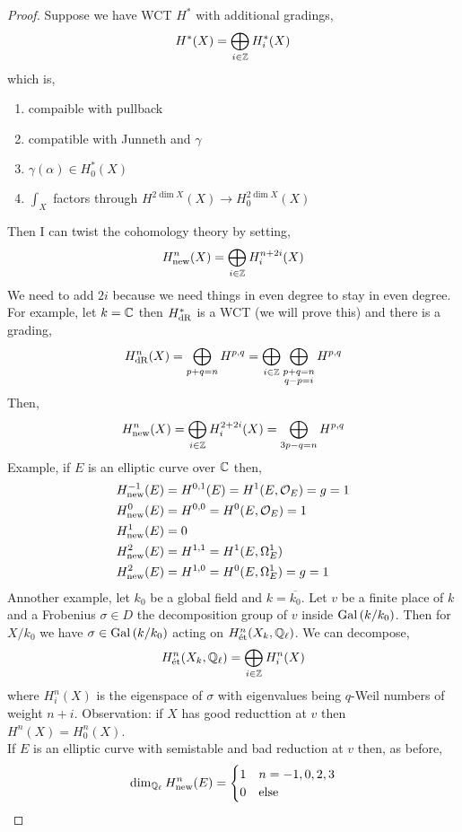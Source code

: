 \documentclass[12pt]{article}
\begin{document}
\begin{proof}
Suppose we have WCT $H^*$ with additional gradings,
\[ H^*(X) = \bigoplus_{i \in \mathbb{Z}} H^*_i(X) \]
which is,
\begin{enumerate}
\item compaible with pullback
\item compatible with Junneth and $\gamma$
\item $\gamma(\alpha) \in H^*_0(X)$
\item $\int_X$ factors through $H^{2 \dim{X}}(X) \to H_0^{2 \dim{X}}(X)$
\end{enumerate}
Then I can twist the cohomology theory by setting,
\[ H^n_{\text{new}}(X) = \bigoplus_{i \in \mathbb{Z}} H^{n + 2 i}_i(X) \]
We need to add $2i$ because we need things in even degree to stay in even degree. 
\bigskip\\
For example, let $k = \mathbb{C}$ then $H^*_{\mathrm{dR}}$ is a WCT (we will prove this) and there is a grading,
\[ H^n_{\mathrm{dR}}(X) = \bigoplus_{p + q = n} H^{p,q} = \bigoplus_{i \in \mathbb{Z}} \bigoplus_{\substack{p + q = n \\ q - p = i}} H^{p,q} \]
Then,
\[ H_{\text{new}}^n(X) = \bigoplus_{i \in \mathbb{Z}} H^{2 + 2i}_i(X) = \bigoplus_{3 p - q = n} H^{p,q} \]
Example, if $E$ is an elliptic curve over $\mathbb{C}$ then,
\begin{align*}
H^{-1}_{\text{new}}(E) & = H^{0,1}(E) = H^1(E, \mathcal{O}_{E}) = g = 1 
\\
H^0_{\text{new}}(E) & = H^{0,0} = H^0(E, \mathcal{O}_{E}) = 1 
\\
H^1_{\text{new}}(E) & = 0
\\
H^2_{\text{new}}(E) & = H^{1,1} = H^1(E, \Omega^1_E) 
\\
H^2_{\text{new}}(E) & = H^{1,0} =H^0(E, \Omega^1_E) = g = 1
\end{align*}
Annother example, let $k_0$ be a global field and $k = \overline{k_0}$. Let $v$ be a finite place of $k$ and a Frobenius $\sigma \in D$ the decomposition group of $v$ inside $\mathrm{Gal}\left( k / k_0 \right)$. Then for $X / k_0$ we have $\sigma \in \mathrm{Gal}\left( k / k_0 \right)$ acting on $H^n_{\text{\'{e}t}}(X_k, \mathbb{Q}_\ell)$. We can decompose,
\[ H^n_{\text{\'{e}t}}(X_k, \mathbb{Q}_\ell) = \bigoplus_{i \in \mathbb{Z}} H^n_i(X) \]
where $H^n_i(X)$ is the eigenspace of $\sigma$ with eigenvalues being $q$-Weil numbers of weight $n + i$. Observation: if $X$ has good reducttion at $v$ then $H^n(X) = H^n_0(X)$. 
\bigskip\\
If $E$ is an elliptic curve with semistable and bad reduction at $v$ then, as before,
\begin{align*}
\dim_{\mathbb{Q}_\ell} H^n_{\text{new}}(E) = \begin{cases}
1 & n = -1,0,2,3
\\
0 & \text{else}
\end{cases} 
\end{align*}
\end{proof}
\end{document}
